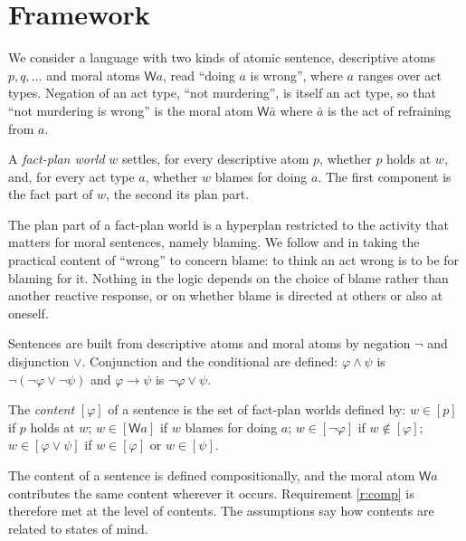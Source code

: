 \documentclass{situationist-preprint}
\begin{document}
\section{Framework}\label{s:framework}

We consider a language with two kinds of atomic sentence, descriptive atoms $p, q, \ldots$ and moral atoms $\mathsf{W}a$, read \enquote{doing $a$ is wrong}, where $a$ ranges over act types. Negation of an act type, \enquote{not murdering}, is itself an act type, so that \enquote{not murdering is wrong} is the moral atom $\mathsf{W}\bar a$ where $\bar a$ is the act of refraining from $a$.

\begin{definition}\label{d:world}
A \emph{fact-plan world} $w$ settles, for every descriptive atom $p$, whether $p$ holds at $w$, and, for every act type $a$, whether $w$ blames for doing $a$. The first component is the fact part of $w$, the second its plan part.
\end{definition}

The plan part of a fact-plan world is a hyperplan restricted to the activity that matters for moral sentences, namely blaming. We follow \citet{Gibbard1990} and \citet{Schroeder2008book} in taking the practical content of \enquote{wrong} to concern blame: to think an act wrong is to be for blaming for it. Nothing in the logic depends on the choice of blame rather than another reactive response, or on whether blame is directed at others or also at oneself.

\begin{definition}[Sentences]\label{d:sent}
Sentences are built from descriptive atoms and moral atoms by negation $\neg$ and disjunction $\vee$. Conjunction and the conditional are defined: $\varphi\wedge\psi$ is $\neg(\neg\varphi\vee\neg\psi)$ and $\varphi\to\psi$ is $\neg\varphi\vee\psi$.
\end{definition}

\begin{definition}[Content]\label{d:content}
The \emph{content} $[\varphi]$ of a sentence is the set of fact-plan worlds defined by: $w\in[p]$ if $p$ holds at $w$; $w\in[\mathsf{W}a]$ if $w$ blames for doing $a$; $w\in[\neg\varphi]$ if $w\notin[\varphi]$; $w\in[\varphi\vee\psi]$ if $w\in[\varphi]$ or $w\in[\psi]$.
\end{definition}

The content of a sentence is defined compositionally, and the moral atom $\mathsf{W}a$ contributes the same content wherever it occurs. Requirement \ref{r:comp} is therefore met at the level of contents. The assumptions say how contents are related to states of mind.
\end{document}
